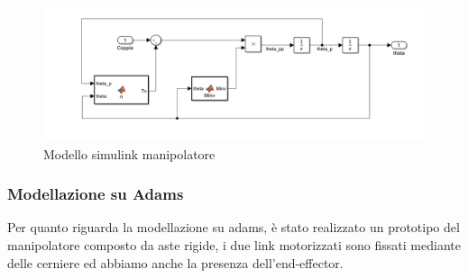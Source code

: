 \begin{figure}[ht]
	\begin{center}
		\includegraphics[scale=0.55]{Immagini/Dinamica/ModSimulink}
		\caption{Modello simulink manipolatore}
	\end{center}
\end{figure}
\subsubsection*{Modellazione su Adams}
Per quanto riguarda la modellazione su adams, è stato realizzato un prototipo del manipolatore composto da aste rigide, i due link motorizzati sono fissati mediante delle cerniere ed abbiamo anche la presenza dell'end-effector.

